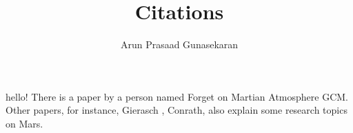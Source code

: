 \documentclass[10pt,a4paper]{article}
\author{Arun Prasaad Gunasekaran}
\title{Citations}
\begin{document}
\maketitle
hello!
There is a paper by a person named Forget \citep{forget_1991} on Martian Atmosphere GCM. Other papers, for instance, Gierasch \citep{gierasch1968study}, Conrath, \cite{conrath1975thermal} also explain some research topics on Mars.


\end{document}
